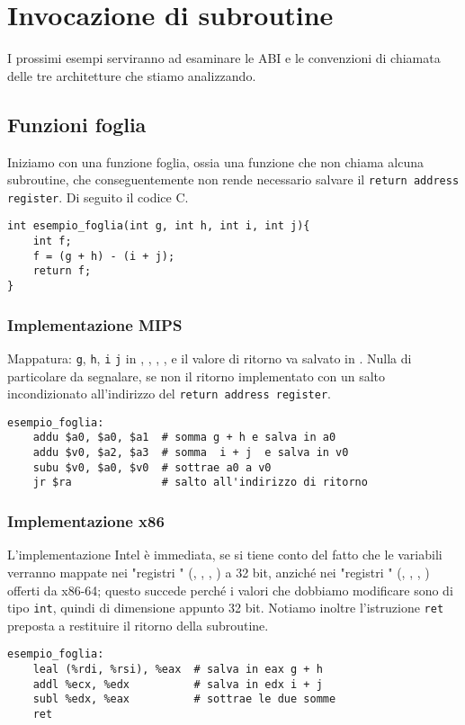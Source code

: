 \documentclass[class=book, crop=false, oneside]{standalone}
\begin{document}
\section{Invocazione di subroutine}
I prossimi esempi serviranno ad esaminare le ABI e le convenzioni di chiamata delle tre architetture che stiamo analizzando.
\subsection*{Funzioni foglia}
Iniziamo con una funzione foglia, ossia una funzione che non chiama alcuna subroutine, che conseguentemente non rende necessario salvare il \texttt{return address register}. Di seguito il codice C.
\begin{verbatim}
int esempio_foglia(int g, int h, int i, int j){
	int f;
	f = (g + h) - (i + j);
	return f;
}
\end{verbatim}

\subsubsection{Implementazione MIPS}
Mappatura: \texttt{g}, \texttt{h}, \texttt{i} \texttt{j} in , , , , e il valore di ritorno va salvato in . Nulla di particolare da segnalare, se non il ritorno implementato con un salto incondizionato all'indirizzo del \texttt{return address register}.
\begin{verbatim}
esempio_foglia:
	addu $a0, $a0, $a1  # somma g + h e salva in a0
	addu $v0, $a2, $a3  # somma  i + j  e salva in v0
	subu $v0, $a0, $v0  # sottrae a0 a v0
	jr $ra              # salto all'indirizzo di ritorno
\end{verbatim}

\subsubsection{Implementazione x86}
L'implementazione Intel è immediata, se si tiene conto del fatto che le variabili verranno mappate nei "registri " (, , , ) a 32 bit, anziché nei "registri " (, , , ) offerti da x86-64; questo succede perché i valori che dobbiamo modificare sono di tipo \texttt{int}, quindi di dimensione appunto 32 bit. Notiamo inoltre l'istruzione \texttt{ret} preposta a restituire il ritorno della subroutine.
\begin{verbatim}
esempio_foglia:
	leal (%rdi, %rsi), %eax  # salva in eax g + h
	addl %ecx, %edx          # salva in edx i + j
	subl %edx, %eax          # sottrae le due somme
	ret
\end{verbatim}
\end{document}
